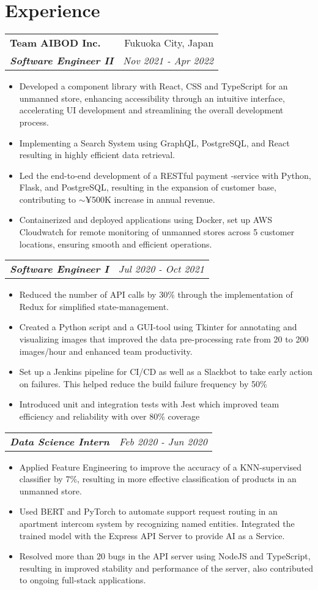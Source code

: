 \documentclass[letterpaper]{article}
\makeatletter
\newcommand{\resumeItemWithoutTitle}[1]{
  \item{
    {#1 \vspace{-4pt}}
  }
}
\newcommand{\resumeSubheadingWithoutTitle}[2]{
  \begin{tabular*}{\textwidth}{l@{\extracolsep{\fill}}r}
        \textbf{\textit{#1}} & \textit{ #2} \\
    \end{tabular*}\vspace{-15pt}
}
\newcommand{\resumeSubheading}[4]{
    \begin{tabular*}{\textwidth}{l@{\extracolsep{\fill}}r}
        \textbf{#1} & #2 \\
        \textbf{\textit{#3}} & \textit{ #4} \\
    \end{tabular*}\vspace{-10pt}
}
\newcommand{\shortSection}[1]{
    \vspace{-6pt}
    \section{#1}
}
\newcommand{\resumeItemListStart}{\begin{itemize}}
\newcommand{\resumeItemListEnd}{\end{itemize}}
\makeatother
\begin{document}
\shortSection{Experience}
\resumeSubheading
{Team AIBOD Inc.}{Fukuoka City, Japan}
{Software Engineer II}{Nov 2021 - Apr 2022}
\vspace{2pt}
\resumeItemListStart
\resumeItemWithoutTitle{Developed a component library with React, CSS and TypeScript for an unmanned store, enhancing accessibility through an intuitive interface, accelerating UI development and streamlining the overall development process.}
\resumeItemWithoutTitle{Implementing a Search System using GraphQL, PostgreSQL, and React resulting in highly efficient data retrieval.}
\resumeItemWithoutTitle{Led the end-to-end development of a RESTful payment -service with Python, Flask, and PostgreSQL, resulting in the expansion of customer base, contributing to $\sim$¥500K increase in annual revenue.}
\resumeItemWithoutTitle{Containerized and deployed applications using Docker, set up AWS Cloudwatch for remote monitoring of unmanned stores across 5 customer locations, ensuring smooth and efficient operations.}
\resumeItemListEnd

\vspace{2pt}
\resumeSubheadingWithoutTitle
{Software Engineer I}{Jul 2020 - Oct 2021}
\vspace{0pt}
\resumeItemListStart
\resumeItemWithoutTitle{Reduced the number of API calls by 30\% through the implementation of Redux for simplified state-management.}
\resumeItemWithoutTitle{Created a Python script and a GUI-tool using Tkinter for annotating and visualizing images that improved the data pre-processing rate from 20 to 200 images/hour and enhanced team productivity.}
\resumeItemWithoutTitle{Set up a Jenkins pipeline for CI/CD as well as a Slackbot to take early action on failures. This helped reduce the build failure frequency by 50\%}
\resumeItemWithoutTitle{Introduced unit and integration tests with Jest which improved team efficiency and reliability with over 80\% coverage}
\resumeItemListEnd

\vspace{2pt}
\resumeSubheadingWithoutTitle
{Data Science Intern}{Feb 2020 - Jun 2020}
\vspace{0pt}
\resumeItemListStart
\resumeItemWithoutTitle{Applied Feature Engineering to improve the accuracy of a KNN-supervised classifier by 7\%, resulting in more effective classification of products in an unmanned store.}
\resumeItemWithoutTitle{Used BERT and PyTorch to automate support request routing in an apartment intercom system by recognizing named entities. Integrated the trained model with the Express API Server to provide AI as a Service.}
\resumeItemWithoutTitle{Resolved more than 20 bugs in the API server using NodeJS and TypeScript, resulting in improved stability and performance of the server, also contributed to ongoing full-stack applications.}
\resumeItemListEnd
\end{document}
